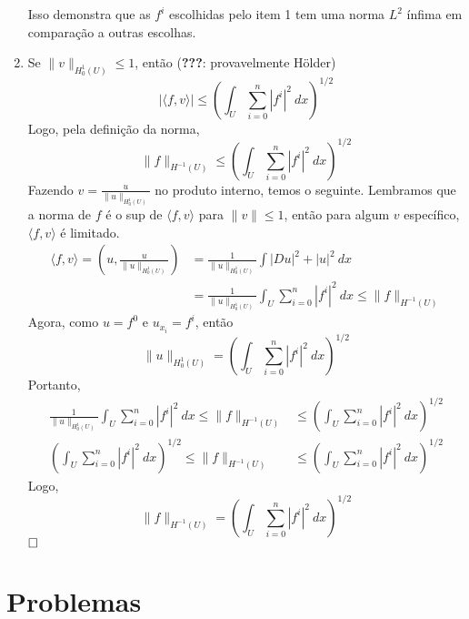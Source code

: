 \documentclass[a4paper, 11pt]{book}
\newcommand{\qed}{$\hfill\square$}
\begin{document}
\begin{enumerate}
	Isso demonstra que as $f^i$ escolhidas pelo item 1 tem uma norma $L^2$ ínfima em comparação a outras escolhas.

	\item Se $\|v\|_{H^1_0(U)}\leq 1$, então (\textbf{???}: provavelmente Hölder)\[
	| \langle f, v \rangle | \leq \left( \int_{U} \sum_{i=0}^{n} |f^i|^2 \ dx  \right)^{1/2}	
	\]
	Logo, pela definição da norma, \[
	\|f\|_{H^{-1}(U)} \leq \left( \int_U \sum_{i=0}^{n} |f^i|^2 \ dx \right)^{1/2}	
	\]
	Fazendo $v = \frac{u}{\|u\|_{H^1_0(U)}}$ no produto interno, temos o seguinte. Lembramos que a norma de $f$ é o sup de $\langle f, v \rangle$ para $\|v\|\leq 1$, então para algum $v$ específico, $\langle f, v \rangle$ é limitado.
	\begin{align*}
		\langle f, v \rangle = \left( u, \tfrac{u}{\|u\|_{H^1_0(U)}} \right) &= \frac{1}{\|u\|_{H^1_0(U)}}\int |Du|^2 + |u|^2 \ dx \\
		 &= \frac{1}{\|u\|_{H^1_0(U)}}\int_{U} \sum_{i=0}^{n} |f^i|^2 \ dx \leq \|f\|_{H^{-1}(U)}
	\end{align*}
	Agora, como $u=f^0$ e $u_{x_i}=f^i$, então
	\[
	\|u\|_{H^1_0(U)} = \left( \int_U \sum_{i=0}^{n} |f^i|^2 \ dx \right)^{1/2} 	
	\]
	Portanto,
	\begin{align*}
		\frac{1}{\|u\|_{H^1_0(U)}}\int_{U} \sum_{i=0}^{n} |f^i|^2 \ dx \leq \|f\|_{H^{-1}(U)} &\leq \left( \int_U \sum_{i=0}^{n} |f^i|^2 \ dx\right)^{1/2} \\
		\left( \int_U \sum_{i=0}^{n} |f^i|^2 \ dx\right)^{1/2} \leq \|f\|_{H^{-1}(U)} &\leq \left( \int_U \sum_{i=0}^{n} |f^i|^2 \ dx\right)^{1/2}
	\end{align*}
	Logo, \[\|f\|_{H^{-1}(U)} = \left( \int_U \sum_{i=0}^{n} |f^i|^2 \ dx\right)^{1/2}\]
	\qed


\end{enumerate}

\section{Problemas}
\end{document}
